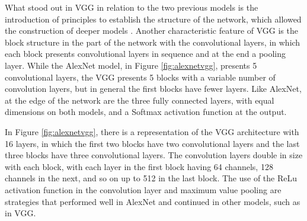 What stood out in VGG in relation to the two previous models is the introduction of principles to establish the structure of the network, which allowed the construction of deeper models \cite{zhang2020dive}. Another characteristic feature of VGG is the block structure in the part of the network with the convolutional layers, in which each block presents convolutional layers in sequence and at the end a pooling layer. While the AlexNet model, in Figure \ref{fig:alexnetvgg}, presents 5 convolutional layers, the VGG presents 5 blocks with a variable number of convolution layers, but in general the first blocks have fewer layers. Like AlexNet, at the edge of the network are the three fully connected layers, with equal dimensions on both models, and a Softmax activation function at the output.

In Figure \ref{fig:alexnetvgg}, there is a representation of the VGG architecture with 16 layers, in which the first two blocks have two convolutional layers and the last three blocks have three convolutional layers. The convolution layers double in size with each block, with each layer in the first block having 64 channels, 128 channels in the next, and so on up to 512 in the last block. The use of the ReLu activation function in the convolution layer and maximum value pooling are strategies that performed well in AlexNet and continued in other models, such as in VGG.

